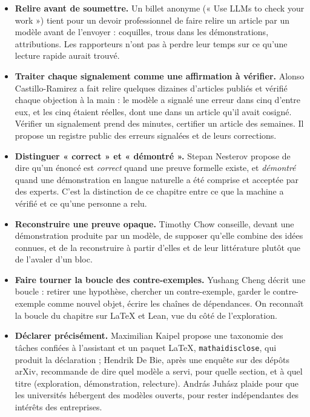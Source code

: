 \begin{itemize}
  \item \textbf{Relire avant de soumettre.} Un billet anonyme (« Use LLMs to check your
        work ») tient pour un devoir professionnel de faire relire un article par un
        modèle avant de l'envoyer : coquilles, trous dans les démonstrations, attributions.
        Les rapporteurs n'ont pas à perdre leur temps sur ce qu'une lecture rapide aurait
        trouvé.
  \item \textbf{Traiter chaque signalement comme une affirmation à vérifier.} Alonso
        Castillo-Ramirez a fait relire quelques dizaines d'articles publiés et vérifié chaque
        objection à la main : le modèle a signalé une erreur dans cinq d'entre eux, et les
        cinq étaient réelles, dont une dans un article qu'il avait cosigné. Vérifier un signalement prend des minutes, certifier un article des
        semaines. Il propose un registre public des erreurs signalées et de leurs
        corrections.
  \item \textbf{Distinguer « correct » et « démontré ».} Stepan Nesterov propose de dire
        qu'un énoncé est \emph{correct} quand une preuve formelle existe, et
        \emph{démontré} quand une démonstration en langue naturelle a été comprise et
        acceptée par des experts. C'est la distinction de ce chapitre entre ce que la
        machine a vérifié et ce qu'une personne a relu.
  \item \textbf{Reconstruire une preuve opaque.} Timothy Chow conseille, devant une
        démonstration produite par un modèle, de supposer qu'elle combine des idées
        connues, et de la reconstruire à partir d'elles et de leur littérature plutôt que de
        l'avaler d'un bloc.
  \item \textbf{Faire tourner la boucle des contre-exemples.} Yushang Cheng décrit une
        boucle : retirer une hypothèse, chercher un contre-exemple, garder le
        contre-exemple comme nouvel objet, écrire les chaînes de dépendances. On reconnaît la
        boucle du chapitre sur LaTeX et Lean, vue du côté de l'exploration.
  \item \textbf{Déclarer précisément.} Maximilian Kaipel propose une taxonomie des tâches
        confiées à l'assistant et un paquet LaTeX, \texttt{mathaidisclose}, qui produit la
        déclaration ; Hendrik De Bie, après une enquête sur des dépôts arXiv, recommande de
        dire quel modèle a servi, pour quelle section, et à quel titre (exploration,
        démonstration, relecture). András Juhász plaide pour que les universités hébergent
        des modèles ouverts, pour rester indépendantes des intérêts des entreprises.
\end{itemize}

